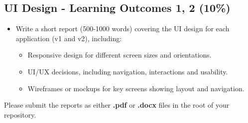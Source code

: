 \documentclass{article}
\begin{document}
\subsection*{UI Design - Learning Outcomes 1, 2 (10\%)}
\begin{itemize}
  \item Write a short report (500-1000 words) covering the UI design for each application (v1 and v2), including:
  \begin{itemize}
    \item Responsive design for different screen sizes and orientations.
    \item UI/UX decisions, including navigation, interactions and usability.
    \item Wireframes or mockups for key screens showing layout and navigation.
  \end{itemize}
\end{itemize}

Please submit the reports as either \textbf{.pdf} or \textbf{.docx} files in the root of your repository.
\end{document}
